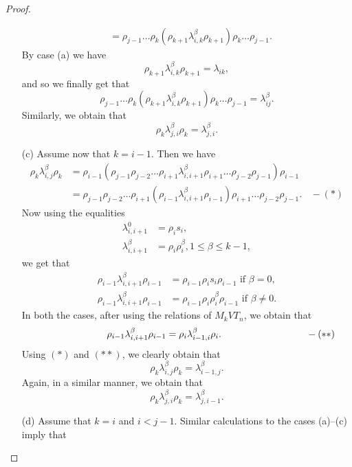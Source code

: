 \documentclass[preprint]{elsarticle}
\begin{document}
\begin{proof}
\begin{itemize}
\begin{align*}
            &= \rho_{j-1} \dots \rho_{k}(\rho_{k+1} \lambda_{i,k}^{\beta}\rho_{k+1})\rho_{k} \dots \rho_{j-1}.
        \end{align*}
       By case (a) we have
        \[
        \rho_{k+1} \lambda_{i,k}^{\beta}\rho_{k+1} = \lambda_{ik},
        \]
        and so we finally get that
        \[
        \rho_{j-1} \dots \rho_{k}(\rho_{k+1} \lambda_{i,k}^{\beta}\rho_{k+1})\rho_{k} \dots \rho_{j-1}= \lambda_{ij}^{\beta}.
        \]
        Similarly, we obtain that 
        $$\rho_k \lambda_{j,i}^{\beta} \rho_k = \lambda_{j,i}^{\beta}.$$
        \item[(c)] Assume now that $k=i-1$. Then we have
\begin{align*}
     \rho_k \lambda_{i,j}^{\beta} \rho_k &= \rho_{i-1} (\rho_{j-1} \rho_{j-2} \dots \rho_{i+1} \lambda_{i,i+1}^{\beta} \rho_{i+1}\dots \rho_{j-2} \rho_{j-1})\rho_{i-1}\\
     &= \rho_{j-1} \rho_{j-2} \dots \rho_{i+1} (\rho_{i-1} \lambda_{i,i+1}^{\beta} \rho_{i-1}) \rho_{i+1}\dots \rho_{j-2} \rho_{j-1}. ~~~~-(*)
\end{align*}
    Now using the equalities 
    \begin{align*}
        \lambda_{i,i+1}^0 &= \rho_is_i,\\
    \lambda_{i,i+1}^{\beta} &= \rho_i\rho_i^{\beta}, 1\leq \beta \leq k-1,
    \end{align*}
    we get that
    \begin{align*}
        \rho_{i-1} \lambda_{i,i+1}^{\beta} \rho_{i-1} &= \rho_{i-1} \rho_i s_i \rho_{i-1} \text{ if } \beta=0,\\
         \rho_{i-1} \lambda_{i,i+1}^{\beta} \rho_{i-1} &=\rho_{i-1} \rho_i \rho_i^{\beta} \rho_{i-1} \text{ if } \beta \neq 0.
    \end{align*}
    In both the cases, after using the relations of $M_kVT_n$, we obtain that
    \[
    \hspace{2.5cm} \rho_{i-1} \lambda_{i,i+1}^{\beta} \rho_{i-1} = \rho_{i} \lambda_{i-1,i}^{\beta} \rho_{i}. \hspace{3cm}~-(**)
    \]
    Using $(*)$ and $(**)$, we clearly obtain that 
    $$\rho_k \lambda_{i,j}^{\beta} \rho_k = \lambda_{i-1,j}^{\beta}.$$
Again, in a similar manner, we obtain that 
$$\rho_k \lambda_{j,i}^{\beta} \rho_k = \lambda_{j,i-1}^{\beta}.$$
\item[(d)] Assume that $k=i$ and $i<j-1$. Similar calculations to the cases (a)--(c) imply that

\end{itemize}
\end{proof}
\end{document}
